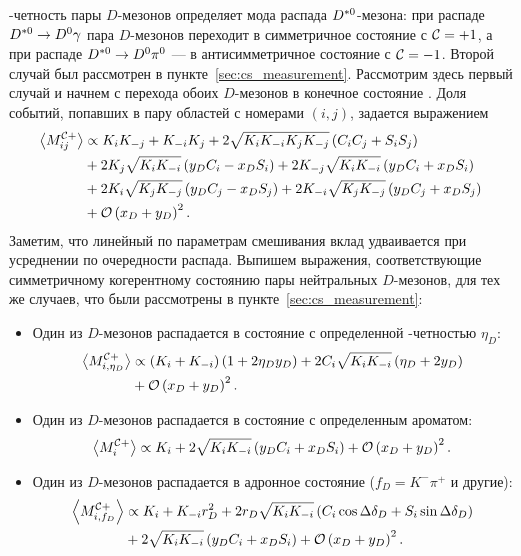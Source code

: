\cconj-четность пары $D$-мезонов определяет мода распада $D^{*0}$-мезона: при распаде $D^{*0}\to D^0\gamma$ пара $D$-мезонов переходит в симметричное состояние с $\mathcal{C}=+1$, а при распаде $D^{*0}\to D^0\pi^0$ --- в антисимметричное состояние с $\mathcal{C}=-1$.  Второй случай был рассмотрен в пункте~\ref{sec:cs_measurement}.  Рассмотрим здесь первый случай и начнем с перехода обоих $D$-мезонов в конечное состояние \kspp.  Доля событий, попавших в пару областей с номерами $(i,j)$, задается выражением
\begin{equation}\label{eq:m_sym}
\begin{split}
  \left<M^{\mathcal{C}+}_{ij}\right> 
  & \propto K_iK_{-j}+K_{-i}K_j + 2\sqrt{K_iK_{-i}K_jK_{-j}}\left(C_iC_j+S_iS_j\right) \\
  & + 2K_j\sqrt{K_iK_{-i}}\left( y_DC_i-x_DS_i\right) + 2K_{-j}\sqrt{K_iK_{-i}}\left( y_DC_i+x_DS_i\right) \\
  & + 2K_i\sqrt{K_jK_{-j}}\left( y_DC_j-x_DS_j\right) + 2K_{-i}\sqrt{K_jK_{-j}}\left( y_DC_j+x_DS_j\right) \\
  & + \mathcal{O}\left(x_D+y_D\right)^2.
\end{split}
\end{equation}
Заметим, что линейный по параметрам смешивания вклад удваивается при усреднении по очередности распада.  Выпишем выражения, соответствующие симметричному когерентному состоянию пары нейтральных $D$-мезонов, для тех же случаев, что были рассмотрены в пункте~\ref{sec:cs_measurement}:
\begin{itemize}
 \item Один из $D$-мезонов распадается в состояние с определенной \cpconj-четностью $\eta_D$:
 \begin{equation}\label{eq:m_cp_sym}
  \begin{split}
   \left<M^{\mathcal{C}+}_{i,\eta_D}\right> 
  & \propto \left(K_i+K_{-i}\right)\left(1 + 2\eta_D y_D\right) + 2C_i\sqrt{K_iK_{-i}}\left(\eta_D + 2y_D\right) \\
  & + \mathcal{O}\left(x_D+y_D\right)^2.
  \end{split}
 \end{equation}
 \item Один из $D$-мезонов распадается в состояние с определенным ароматом:
 \begin{equation}\label{eq:m_flv_sym}
  \left<M^{\mathcal{C}+}_{i}\right> 
  \propto K_i + 2\sqrt{K_iK_{-i}}\left( y_DC_i+x_DS_i\right) + \mathcal{O}\left(x_D+y_D\right)^2.
 \end{equation}
 \item Один из $D$-мезонов распадается в адронное состояние ($f_D = K^-\pi^+$ и другие):
 \begin{equation}\label{eq:m_kpi_sym}
\begin{split}
  \left<M^{\mathcal{C}+}_{i,f_D}\right> 
  & \propto K_i+K_{-i}r_D^2 + 2r_D\sqrt{K_iK_{-i}}\left(C_i\cos\Delta\delta_D+S_i\sin\Delta\delta_D\right) \\
  & + 2\sqrt{K_iK_{-i}}\left( y_DC_i+x_DS_i\right) + \mathcal{O}\left(x_D+y_D\right)^2.
\end{split}
\end{equation}
\end{itemize}

